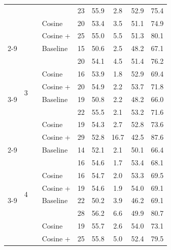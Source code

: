 \begin{longtable}{lll l c c c c c}
 &  &  & \method{} & 23 & 55.9 & 2.8 & 52.9 & 75.4 \\
 &  &  & Cosine & 20 & 53.4 & 3.5 & 51.1 & 74.9 \\
 &  &  & Cosine + \method{} & 25 & 55.0 & 5.5 & 51.3 & 80.1 \\
\cmidrule(lr){2-9}
 & \multirow{8}{*}{3} & \multirow{4}{*}{\adamw{}} & Baseline & 15 & 50.6 & 2.5 & 48.2 & 67.1 \\
 &  &  & \method{} & 20 & 54.1 & 4.5 & 51.4 & 76.2 \\
 &  &  & Cosine & 16 & 53.9 & 1.8 & 52.9 & 69.4 \\
 &  &  & Cosine + \method{} & 20 & 54.9 & 2.2 & 53.7 & 71.8 \\
\cmidrule(lr){3-9}
 &  & \multirow{4}{*}{\sgdm{}} & Baseline & 19 & 50.8 & 2.2 & 48.2 & 66.0 \\
 &  &  & \method{} & 22 & 55.5 & 2.1 & 53.2 & 71.6 \\
 &  &  & Cosine & 19 & 54.3 & 2.7 & 52.8 & 73.6 \\
 &  &  & Cosine + \method{} & 29 & 52.8 & 16.7 & 42.5 & 87.6 \\
\cmidrule(lr){2-9}
 & \multirow{8}{*}{4} & \multirow{4}{*}{\adamw{}} & Baseline & 14 & 52.1 & 2.1 & 50.1 & 66.4 \\
 &  &  & \method{} & 16 & 54.6 & 1.7 & 53.4 & 68.1 \\
 &  &  & Cosine & 16 & 54.7 & 2.0 & 53.3 & 69.5 \\
 &  &  & Cosine + \method{} & 19 & 54.6 & 1.9 & 54.0 & 69.1 \\
\cmidrule(lr){3-9}
 &  & \multirow{4}{*}{\sgdm{}} & Baseline & 22 & 50.2 & 3.9 & 46.2 & 69.1 \\
 &  &  & \method{} & 28 & 56.2 & 6.6 & 49.9 & 80.7 \\
 &  &  & Cosine & 19 & 55.7 & 2.6 & 54.0 & 73.1 \\
 &  &  & Cosine + \method{} & 25 & 55.8 & 5.0 & 52.4 & 79.5 \\
\end{longtable}
\endgroup
